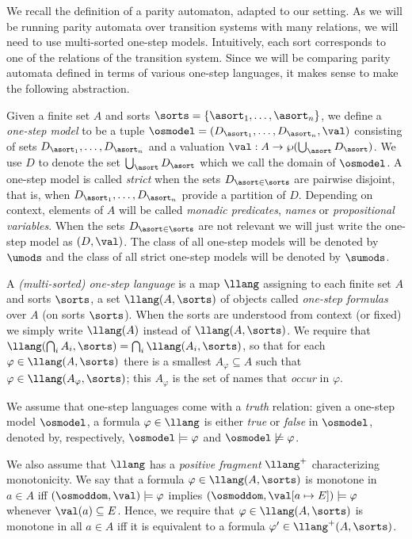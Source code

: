 
We recall the definition of a parity automaton, adapted to our setting.
As we will be running parity automata over transition systems with many
relations, we will need to use multi-sorted one-step models. Intuitively,
each sort corresponds to one of the relations of the transition system.
Since we will be comparing parity automata defined in terms of various
one-step languages, it makes sense to make the following abstraction.


\begin{definition}
Given a finite set $A$ and sorts $\sorts = \{\asort_1,\dots,\asort_n\}$,
we define a \emph{one-step model} to be a tuple $\osmodel = (D_{\asort_1},\dots,D_{\asort_n},\val)$
consisting of sets $D_{\asort_1},\dots,D_{\asort_n}$ 
and a valuation $\val: A \to \wp (\bigcup_\asort D_\asort)$.
We use $D$ to denote the set $\bigcup_\asort D_\asort$ which we call the domain of $\osmodel$.
A one-step model is called \emph{strict} when the sets $D_{\asort\in\sorts}$ are pairwise disjoint, that is, when $D_{\asort_1},\dots,D_{\asort_n}$ provide a partition of $D$.
Depending on context, elements of $A$ will be called \emph{monadic predicates}, \emph{names}
or \emph{propositional variables}. When the sets $D_{\asort\in\sorts}$ are not relevant we will just write the one-step model as $(D,\val)$. The class of all one-step models will be denoted by $\umods$ and the class of all strict one-step models will be denoted by $\sumods$.


A \emph{(multi-sorted) one-step language} is a map $\llang$ assigning to each finite set $A$ and sorts $\sorts$, a set $\llang(A,\sorts)$ of objects called \emph{one-step formulas} over $A$ (on sorts $\sorts$). When the sorts are understood from context (or fixed) we simply write $\llang(A)$ instead of $\llang(A,\sorts)$.
We require that $\llang(\bigcap_{i} A_{i},\sorts) = \bigcap_{i} \llang(A_{i},\sorts)$,
so that for each $\varphi \in \llang(A,\sorts)$ there is a smallest $A_{\varphi} \subseteq A$ such
that $\varphi \in \llang(A_{\varphi},\sorts)$; this $A_{\varphi}$ is the set of names that \emph{occur} in $\varphi$.

We assume that one-step languages come with a \emph{truth}
relation: given a one-step model $\osmodel$, a formula $\varphi \in \llang$
is either \emph{true} or \emph{false} in $\osmodel$, denoted by,
respectively, $\osmodel \models \varphi$ and $\osmodel \not\models \varphi$.
%

We also assume that $\llang$ has a \emph{positive fragment} $\llang^+$
characterizing monotonicity. We say that a formula $\varphi \in \llang(A,\sorts)$ is
monotone in $a\in A$ iff $(\osmoddom,\val) \models \varphi$ implies $(\osmoddom,\val[a\mapsto E]) \models \varphi$ whenever $\val(a) \subseteq E$. Hence, we require that $\varphi \in \llang(A,\sorts)$ is
monotone in all $a\in A$ iff it is equivalent to a formula $\varphi' \in \llang^+(A,\sorts)$.
\end{definition}


